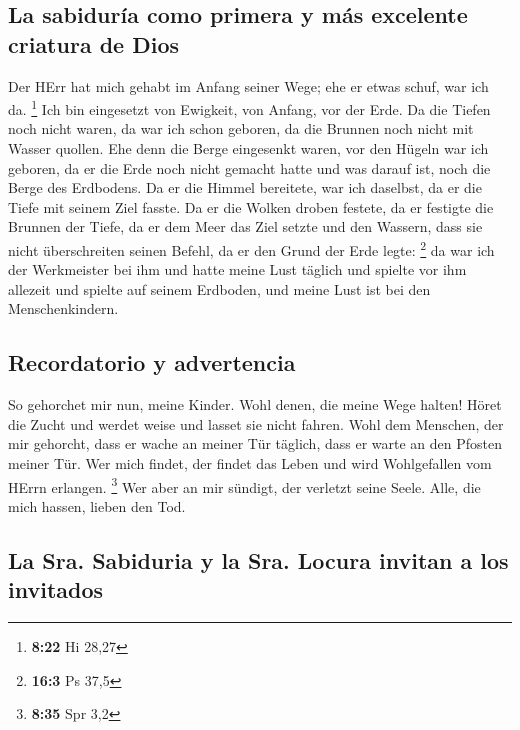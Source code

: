 \hypertarget{la-sabiduruxeda-como-primera-y-muxe1s-excelente-criatura-de-dios}{%
\subsection{La sabiduría como primera y más excelente criatura de
Dios}\label{la-sabiduruxeda-como-primera-y-muxe1s-excelente-criatura-de-dios}}

 Der HErr hat mich gehabt im Anfang seiner Wege; ehe er
etwas schuf, war ich da. \footnote{\textbf{8:22} Hi 28,27}
 Ich bin eingesetzt von Ewigkeit, von Anfang, vor der
Erde.  Da die Tiefen noch nicht waren, da war ich schon
geboren, da die Brunnen noch nicht mit Wasser quollen. 
Ehe denn die Berge eingesenkt waren, vor den Hügeln war ich geboren,
 da er die Erde noch nicht gemacht hatte und was darauf
ist, noch die Berge des Erdbodens.  Da er die Himmel
bereitete, war ich daselbst, da er die Tiefe mit seinem Ziel fasste.
 Da er die Wolken droben festete, da er festigte die
Brunnen der Tiefe,  da er dem Meer das Ziel setzte und
den Wassern, dass sie nicht überschreiten seinen Befehl, da er den Grund
der Erde legte: \footnote{\textbf{16:3} Ps 37,5}  da war
ich der Werkmeister bei ihm und hatte meine Lust täglich und spielte vor
ihm allezeit  und spielte auf seinem Erdboden, und meine
Lust ist bei den Menschenkindern.

\hypertarget{recordatorio-y-advertencia}{%
\subsection{Recordatorio y
advertencia}\label{recordatorio-y-advertencia}}

 So gehorchet mir nun, meine Kinder. Wohl denen, die
meine Wege halten!  Höret die Zucht und werdet weise und
lasset sie nicht fahren.  Wohl dem Menschen, der mir
gehorcht, dass er wache an meiner Tür täglich, dass er warte an den
Pfosten meiner Tür.  Wer mich findet, der findet das
Leben und wird Wohlgefallen vom HErrn erlangen. \footnote{\textbf{8:35}
  Spr 3,2}  Wer aber an mir sündigt, der verletzt seine
Seele. Alle, die mich hassen, lieben den Tod.

\hypertarget{la-sra.-sabiduria-y-la-sra.-locura-invitan-a-los-invitados}{%
\subsection{La Sra. Sabiduria y la Sra. Locura invitan a los
invitados}\label{la-sra.-sabiduria-y-la-sra.-locura-invitan-a-los-invitados}}

